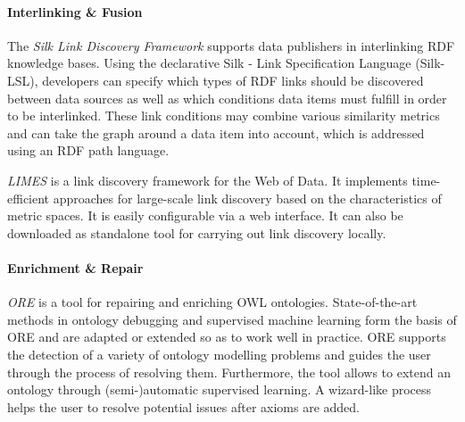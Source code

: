 \documentclass[a4paper, 11pt]{llncs}
\begin{document}
\paragraph{Interlinking \& Fusion}

The \emph{Silk Link Discovery Framework} \cite{silk} supports data publishers in interlinking RDF knowledge bases.
Using the declarative Silk - Link Specification Language (Silk-LSL), developers can specify which types of RDF links should be discovered between data sources as well as which conditions data items must fulfill in order to be interlinked.
These link conditions may combine various similarity metrics and can take the graph around a data item into account, which is addressed using an RDF path language.

\emph{LIMES} \cite{limes} is a link discovery framework for the Web of Data.
It implements time-efficient approaches for large-scale link discovery based on the characteristics of metric spaces.
It is easily configurable via a web interface. It can also be downloaded as standalone tool for carrying out link discovery locally.

\paragraph{Enrichment \& Repair}

\emph{ORE} \cite{lehmann-2010-iswc} is a tool for repairing and enriching OWL ontologies.
State-of-the-art methods in ontology debugging and supervised machine learning form
the basis of ORE and are adapted or extended so as to work well in practice.
ORE supports the detection of a variety of ontology modelling problems and guides
the user through the process of resolving them.
Furthermore, the tool allows to extend an ontology through (semi-)automatic supervised learning.
A wizard-like process helps the user to resolve potential issues after axioms are added.





\enlargethispage{2mm}



\end{document}
